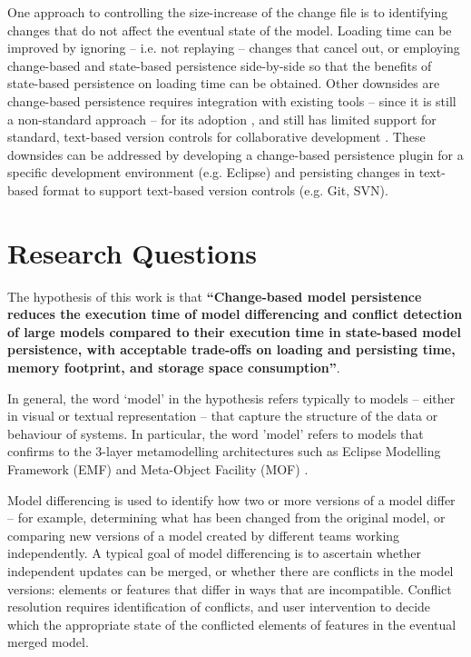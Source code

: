 One approach to controlling the size-increase of the change file is to identifying changes that do not affect the eventual state of the model.  Loading time can be improved by ignoring -- i.e. not replaying -- changes that cancel out, or employing change-based and state-based persistence side-by-side so that the benefits of state-based persistence on loading time can be obtained. Other downsides are change-based persistence requires 
integration with existing tools -- since it is still a non-standard approach -- for its adoption \cite{koegel2010emfstore}, 
and still has limited support for standard, text-based version controls for collaborative development \cite{koegel2010emfstore}. 
These downsides can be addressed by developing a change-based persistence plugin for a specific development environment 
(e.g. Eclipse) and persisting changes in text-based format to support text-based version controls (e.g. Git, SVN).

\section{Research Questions}
\label{sec:research_questions}
The hypothesis of this work is that \textbf{``Change-based model persistence reduces the execution time of model differencing and conflict detection of large models compared to their execution time in state-based model persistence, with acceptable trade-offs on loading and persisting time, memory footprint, and storage space consumption''}. 

In general, the word `model' in the hypothesis refers typically to models -- either in visual or textual representation -- that capture the structure of the data or behaviour of systems. In particular, the word 'model' refers to models that confirms to the 3-layer metamodelling architectures such as Eclipse Modelling Framework (EMF) \cite{eclipse2019emf} and Meta-Object Facility (MOF) \cite{omg2018mof}. 

Model differencing is used to identify how two or more versions of a model differ -- for example, determining what has been changed from the original model, or comparing new versions of a model created by different teams working independently.  A typical goal of model differencing is to ascertain whether independent updates can be merged, or whether there are conflicts in the model versions: elements or features that differ in ways that are incompatible.  Conflict resolution requires identification of conflicts, and user intervention to decide which the appropriate state of the conflicted elements of features in the eventual merged model. 


